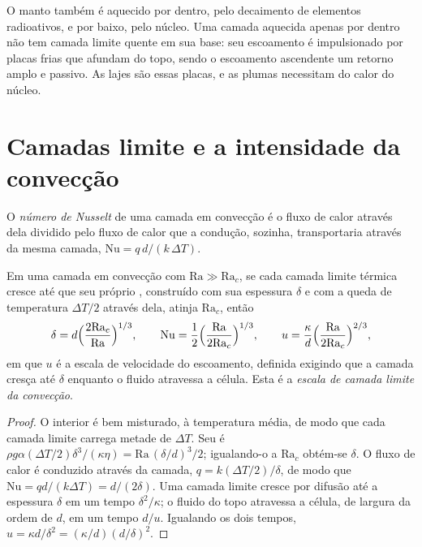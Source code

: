 O manto também é aquecido por dentro, pelo decaimento de elementos radioativos,
e por baixo, pelo núcleo. Uma camada aquecida apenas por dentro não tem
camada limite quente em sua base: seu escoamento é impulsionado por placas frias que afundam do
topo, sendo o escoamento ascendente um retorno amplo e passivo. As lajes são essas placas, e
as plumas necessitam do calor do núcleo.

\section{Camadas limite e a intensidade da convecção}

\begin{definition}\label{def:b3:mantle-convection:nusselt}
O \emph{número de Nusselt} de uma camada em convecção é o
fluxo de calor através dela dividido pelo fluxo de calor que a condução, sozinha, transportaria
através da mesma camada, $\mathrm{Nu} = q\,d/(k\,\Delta T)$.
\end{definition}

\begin{theorem}\label{thm:b3:mantle-convection:scaling}
Em uma camada em convecção com $\mathrm{Ra} \gg \mathrm{Ra}_c$, se cada camada limite térmica
cresce até que seu próprio , construído com sua espessura
$\delta$ e com a queda de temperatura $\Delta T/2$ através dela, atinja
$\mathrm{Ra}_c$, então
\[
  \delta = d\Bigl(\frac{2\mathrm{Ra}_c}{\mathrm{Ra}}\Bigr)^{1/3},\qquad
  \mathrm{Nu} = \frac12\Bigl(\frac{\mathrm{Ra}}{2\mathrm{Ra}_c}\Bigr)^{1/3},
  \qquad
  u = \frac\kappa d\Bigl(\frac{\mathrm{Ra}}{2\mathrm{Ra}_c}\Bigr)^{2/3},
\]
em que $u$ é a escala de velocidade do escoamento, definida exigindo que a
camada cresça até $\delta$ enquanto o fluido atravessa a célula. Esta é a
\emph{escala de camada limite da convecção}.
\end{theorem}

\begin{proof}
O interior é bem misturado, à temperatura média, de modo que cada camada limite
carrega metade de $\Delta T$. Seu  é $\rho g\alpha(\Delta T/2)
\delta^3/(\kappa\eta) = \mathrm{Ra}\,(\delta/d)^3/2$; igualando-o a
$\mathrm{Ra}_c$ obtém-se $\delta$. O fluxo de calor é conduzido através da camada,
$q = k(\Delta T/2)/\delta$, de modo que $\mathrm{Nu} = qd/(k\Delta T) = d/(2\delta)$.
Uma camada limite cresce por difusão até a espessura $\delta$ em um tempo
$\delta^2/\kappa$; o fluido do topo atravessa a célula, de largura da ordem de
$d$, em um tempo $d/u$. Igualando os dois tempos, $u = \kappa d/\delta^2 =
(\kappa/d)(d/\delta)^2$.
\end{proof}

